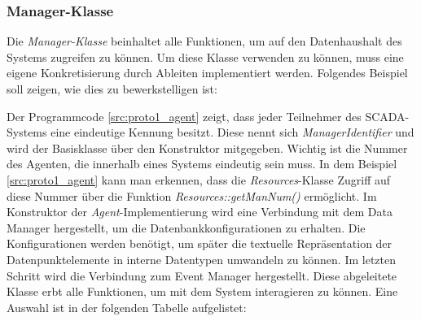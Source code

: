\subsubsection{Manager-Klasse}

Die \textit{Manager-Klasse} beinhaltet alle Funktionen, um auf den Datenhaushalt des Systems zugreifen zu können. 
Um diese Klasse verwenden zu können, muss eine eigene Konkretisierung durch Ableiten implementiert werden. 
Folgendes Beispiel soll zeigen, wie dies zu bewerkstelligen ist:



Der Programmcode \ref{src:proto1_agent} zeigt, dass jeder Teilnehmer des SCADA-Systems eine eindeutige Kennung besitzt. Diese nennt sich \textit{ManagerIdentifier}
und wird der Basisklasse über den Konstruktor mitgegeben. Wichtig ist die Nummer des Agenten, die innerhalb eines
Systems eindeutig sein muss. In dem Beispiel \ref{src:proto1_agent} kann man erkennen, dass die \textit{Resources}-Klasse Zugriff auf diese
Nummer über die Funktion \textit{Resources::getManNum()} ermöglicht. Im Konstruktor der \textit{Agent}-Implementierung wird eine Verbindung mit dem Data Manager hergestellt, um die Datenbankkonfigurationen zu erhalten.
Die Konfigurationen werden benötigt, um später die textuelle Repräsentation der Datenpunktelemente in interne Datentypen umwandeln zu können. Im letzten Schritt
wird die Verbindung zum Event Manager hergestellt. Diese abgeleitete Klasse erbt alle Funktionen, um mit dem System interagieren zu können.
Eine Auswahl ist in der folgenden Tabelle aufgelistet:

